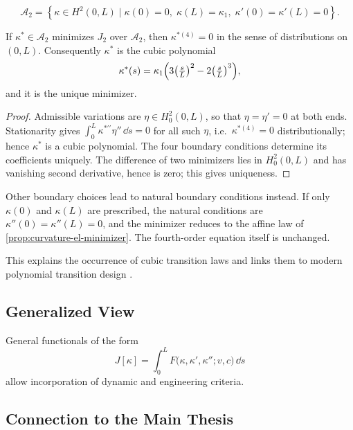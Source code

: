 \begin{definition}
\[
\mathcal{A}_2
=
\left\{
\kappa \in H^2(0,L)
\mid
\kappa(0)=0,\;
\kappa(L)=\kappa_1,\;
\kappa'(0)=\kappa'(L)=0
\right\}.
\]
\end{definition}

\begin{proposition}
\label{prop:curvature-el-fourth-order}
If \(\kappa^\ast\in\mathcal{A}_2\) minimizes \(J_2\) over \(\mathcal{A}_2\),
then \(\kappa^{\ast(4)}=0\) in the sense of distributions on \((0,L)\).
Consequently \(\kappa^\ast\) is the cubic polynomial
\[
\kappa^\ast(s)
=
\kappa_1\Bigl(3\bigl(\tfrac{s}{L}\bigr)^2-2\bigl(\tfrac{s}{L}\bigr)^3\Bigr),
\]
and it is the unique minimizer.
\end{proposition}

\begin{proof}
Admissible variations are \(\eta\in H_0^2(0,L)\), so that
\(\eta=\eta'=0\) at both ends. Stationarity gives
\(\int_0^L\kappa^{\ast\prime\prime}\eta''\,\dd s=0\) for all such
\(\eta\), i.e.\ \(\kappa^{\ast(4)}=0\) distributionally; hence
\(\kappa^\ast\) is a cubic polynomial. The four boundary conditions
determine its coefficients uniquely. The difference of two minimizers
lies in \(H_0^2(0,L)\) and has vanishing second derivative, hence is
zero; this gives uniqueness.
\end{proof}

Other boundary choices lead to natural boundary conditions instead. If
only \(\kappa(0)\) and \(\kappa(L)\) are prescribed, the natural
conditions are \(\kappa''(0)=\kappa''(L)=0\), and the minimizer reduces to
the affine law of \cref{prop:curvature-el-minimizer}. The fourth-order
equation itself is unchanged.

This explains the occurrence of cubic transition laws and links them to
modern polynomial transition design
\cite{ZboinskiWoznica2017Polynomial}.

\subsection{Generalized View}

General functionals of the form
\[
J[\kappa]
=
\int_0^L
F\bigl(\kappa,\kappa',\kappa'';v,c\bigr)\,\dd s
\]
allow incorporation of dynamic and engineering criteria.

\subsection{Connection to the Main Thesis}

